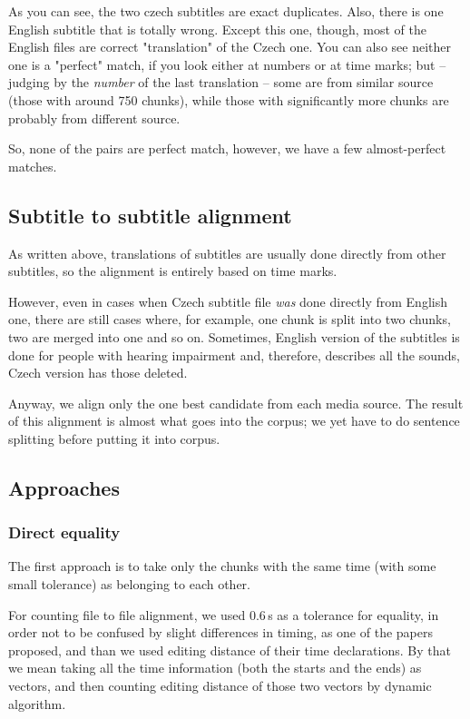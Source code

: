 As you can see, the two czech subtitles are exact duplicates. Also, there is one English subtitle that is totally wrong. Except this one, though, most of the English files are correct "translation" of the Czech one. You can also see neither one is a "perfect" match, if you look either at numbers or at time marks; but -- judging by the \emph{number} of the last translation -- some are from similar source (those with around 750 chunks), while those with significantly more chunks are probably from different source.

So, none of the pairs are perfect match, however, we have a few almost-perfect matches.

\subsection{Subtitle to subtitle alignment}
As written above, translations of subtitles are usually done directly from other subtitles, so the alignment is entirely based on time marks.

However, even in cases when Czech subtitle file \emph{was} done directly from English one, there are still cases where, for example, one chunk is split into two chunks, two are merged into one and so on. Sometimes, English version of the subtitles is done for people with hearing impairment and, therefore, describes all the sounds, Czech version has those deleted.

Anyway, we align only the one best candidate from each media source. The result of this alignment is almost what goes into the corpus; we yet have to do sentence splitting before putting it into corpus.

\subsection{Approaches}
\subsubsection{Direct equality}

The first approach is to take only the chunks with the same time (with some small tolerance) as belonging to each other.

For counting file to file alignment, we used 0.6\,s as a tolerance for equality, in order not to be confused by slight differences in timing, as one of the papers  proposed, and than we used editing distance of their time declarations. By that we mean taking all the time information (both the starts and the ends) as vectors, and then counting editing distance of those two vectors by dynamic algorithm.

